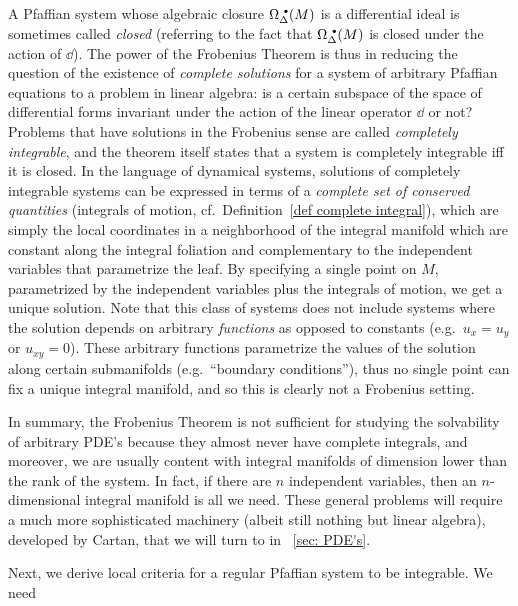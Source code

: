 \begin{rem}\label{rem: complete integrability}
    A Pfaffian system whose algebraic closure $\Omega^{\smbullet}_\Delta(M)$ is a differential ideal is sometimes called \emph{closed} (referring to the fact that $\Omega^{\smbullet}_\Delta(M)$ is closed under the action of $\dd$).
    The power of the Frobenius Theorem is thus in reducing the question of the existence of \emph{complete solutions} for a system of arbitrary Pfaffian equations to a problem in linear algebra: is a certain subspace of the space of differential forms invariant under the action of the linear operator $\dd$ or not? Problems that have solutions in the Frobenius sense are called \emph{completely integrable}, and the theorem itself states that a system is completely integrable iff it is closed. In the language of dynamical systems, solutions of completely integrable systems can be expressed in terms of a \emph{complete set of conserved quantities} (integrals of motion, cf.\ Definition~\ref{def complete integral}), which are simply the local coordinates in a neighborhood of the integral manifold which are constant along the integral foliation and complementary to the independent variables that parametrize the leaf. By specifying a single point on $M$, parametrized by the independent variables plus the integrals of motion, we get a unique solution. Note that this class of systems does not include systems where the solution depends on arbitrary \emph{functions} as opposed to constants (e.g.\ $u_x=u_y$ or $u_{xy}=0$). These arbitrary functions parametrize the values of the solution along certain submanifolds (e.g.~``boundary conditions''), thus no single point can fix a unique integral manifold, and so this is clearly not a Frobenius setting.
    
    In summary, the Frobenius Theorem is not sufficient for studying the solvability of arbitrary PDE's because they almost never have complete integrals, and moreover, we are usually content with integral manifolds of dimension lower than the rank of the system. In fact, if there are $n$ independent variables, then an $n$-dimensional integral manifold is all we need. These general problems will require a much more sophisticated machinery (albeit still nothing but linear algebra), developed by Cartan, that we will turn to in \sect~\ref{sec: PDE's}.
\end{rem}

Next, we derive local criteria for a regular Pfaffian system to be integrable. We need


